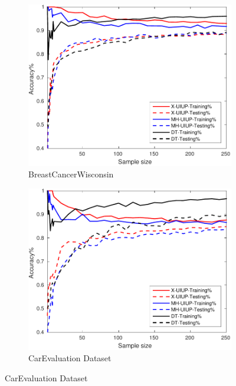 \begin{figure}[ht]
	\centering

  \begin{subfigure}[b]{0.3\textwidth}
		\centering
		\includegraphics[width=\textwidth]{figs/PLPTF/Trees/BreastCancerWisconsinDownsampled_Trees_X_MH.pdf}
		\caption{BreastCancerWisconsin}
		\label{fig:B1}
	\end{subfigure}
  \begin{subfigure}[b]{0.3\textwidth}
		\centering
  	\includegraphics[width=\textwidth]{figs/PLPTF/Trees/CarEvaluation_Trees_X_MH.pdf}
  	\caption{CarEvaluation Dataset}
		\label{fig:Car1}

\end{subfigure}
\end{figure}
